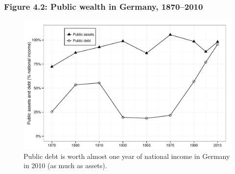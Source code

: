 \documentclass[t]{beamer}\usepackage[]{graphicx}\usepackage[]{color}
\newenvironment{knitrout}{}{} %
\begin{document}
\begin{frame}[label=Figure_4_2]
\frametitle{Figure 4.2: Public wealth in Germany, 1870--2010}
\begin{figure}[t]
\begin{minipage}[b]{\textwidth}
\centering
\begin{knitrout}\footnotesize
{}\color{fgcolor}

{\centering \includegraphics[width=1\linewidth]{figures/bw/Figure_4_2} 

}



\end{knitrout}
\caption{Public debt is worth almost one year of national income in Germany in 2010 (as much as assets).}
\end{minipage}
\end{figure}
\end{frame}
\end{document}
